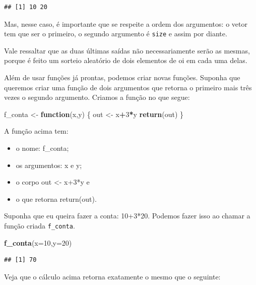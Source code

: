 \documentclass[
]{book}
\newenvironment{Shaded}{\begin{snugshade}}{\end{snugshade}}
\newcommand{\ControlFlowTok}[1]{\textcolor[rgb]{0.13,0.29,0.53}{\textbf{#1}}}
\newcommand{\DataTypeTok}[1]{\textcolor[rgb]{0.13,0.29,0.53}{#1}}
\newcommand{\DecValTok}[1]{\textcolor[rgb]{0.00,0.00,0.81}{#1}}
\newcommand{\KeywordTok}[1]{\textcolor[rgb]{0.13,0.29,0.53}{\textbf{#1}}}
\newcommand{\NormalTok}[1]{#1}
\newcommand{\OperatorTok}[1]{\textcolor[rgb]{0.81,0.36,0.00}{\textbf{#1}}}
\newcommand{\StringTok}[1]{\textcolor[rgb]{0.31,0.60,0.02}{#1}}
\begin{document}
\begin{verbatim}
## [1] 10 20
\end{verbatim}

Mas, nesse caso, é importante que se respeite a ordem dos argumentos: o vetor tem que ser o primeiro, o segundo argumento é \texttt{size} e assim por diante.

Vale ressaltar que as duas últimas saídas não necessariamente serão as mesmas, porque é feito um sorteio aleatório de dois elementos de oi em cada uma delas.

Além de usar funções já prontas, podemos criar novas funções. Suponha que queremos criar uma função de dois argumentos que retorna o primeiro mais três vezes o segundo argumento. Criamos a função no que segue:

\begin{Shaded}
\begin{Highlighting}[]
\NormalTok{f_conta <-}\StringTok{ }\ControlFlowTok{function}\NormalTok{(x,y) \{}
\NormalTok{  out <-}\StringTok{ }\NormalTok{x}\OperatorTok{+}\DecValTok{3}\OperatorTok{*}\NormalTok{y}
  \KeywordTok{return}\NormalTok{(out)}
\NormalTok{\}}
\end{Highlighting}
\end{Shaded}

A função acima tem:

\begin{itemize}
\item
  o nome: f\_conta;
\item
  os argumentos: x e y;
\item
  o corpo out \textless- x+3*y e
\item
  o que retorna return(out).
\end{itemize}

Suponha que eu queira fazer a conta: 10+3*20. Podemos fazer isso ao chamar a função criada \texttt{f\_conta}.

\begin{Shaded}
\begin{Highlighting}[]
\KeywordTok{f_conta}\NormalTok{(}\DataTypeTok{x=}\DecValTok{10}\NormalTok{,}\DataTypeTok{y=}\DecValTok{20}\NormalTok{)}
\end{Highlighting}
\end{Shaded}

\begin{verbatim}
## [1] 70
\end{verbatim}

Veja que o cálculo acima retorna exatamente o mesmo que o seguinte:
\end{document}

